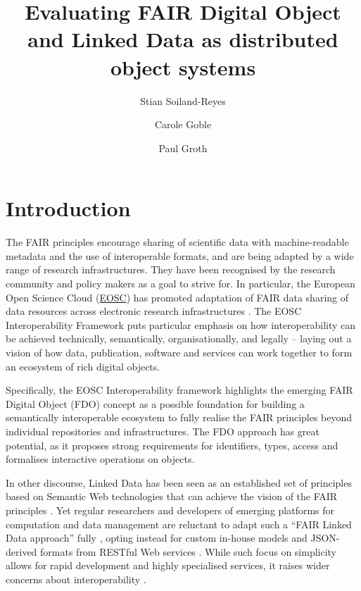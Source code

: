\documentclass[fleqn,10pt,NOlineno]{wlpeerjlua}
\title{Evaluating FAIR Digital Object and Linked Data as distributed object systems}
\author[1,2]{Stian Soiland-Reyes} %
\author[1]{Carole Goble}          %
\author[2]{Paul Groth}            %
\affil[1]{Department of Computer Science, The University of Manchester, UK}
\affil[2]{Informatics Institute, Faculty of Science, University of Amsterdam, NL }
\begin{document}
\flushbottom
\maketitle
\thispagestyle{empty}



\section*{Introduction}\label{sec:introduction}

The FAIR principles \autocite{wilkinsonFAIRGuidingPrinciples2016e} encourage sharing of scientific data with machine-readable metadata and the use of interoperable formats, and are being adapted by a wide range of research infrastructures. They have been recognised by the research community and policy makers as a goal to strive for. In particular, the European Open Science Cloud (\href{https://www.eosc.eu/}{EOSC}) has promoted adaptation of FAIR data sharing of data resources across electronic research infrastructures \autocite{monsCloudyIncreasinglyFAIR2017b}. The EOSC Interoperability Framework \autocite{corchoEOSCInteroperabilityFramework2021b} puts particular emphasis on how interoperability can be achieved technically, semantically, organisationally, and legally -- laying out a vision of how data, publication, software and services can work together to form an ecosystem of rich digital objects.

Specifically, the EOSC Interoperability framework highlights the emerging FAIR Digital Object (FDO) concept \autocite{schultesFAIRPrinciplesDigital2019a} as a possible foundation for building a semantically interoperable ecosystem to fully realise the FAIR principles beyond individual repositories and infrastructures. The FDO approach has great potential, as it proposes strong requirements for identifiers, types, access and formalises interactive operations on objects.

In other discourse, Linked Data \autocite{bizerLinkedDataStory2009a} has been seen as an established set of principles based on Semantic Web technologies that can achieve the vision of the FAIR principles \autocite{boninodasilvasantosFAIRDataPoints2016a,hasnainAssessingFAIRData2018a}. Yet regular researchers and developers of emerging platforms for computation and data management are reluctant to adapt such a ``FAIR Linked Data approach'' fully \autocite{verborghSemanticWebIdentity2020a}, opting instead for custom in-house models and JSON-derived formats from RESTful Web services \autocite{merono-penuelaConclusionFutureChallenges2021a,neumannAnalysisPublicREST2021a}. While such focus on simplicity allows for rapid development and highly specialised services, it raises wider concerns about interoperability \autocite{turcoaneLinkedDataJSONLD2014a,wilkinsonWorkflowsWhenParts2022b}.
\end{document}
